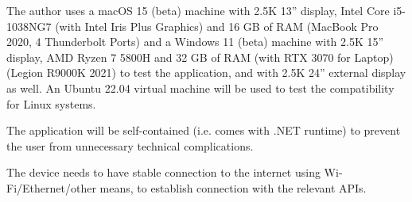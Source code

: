 The author uses a macOS 15 (beta) machine with 2.5K 13'' display, Intel Core i5-1038NG7 (with Intel Iris Plus Graphics) and 16 GB of RAM (MacBook Pro 2020, 4 Thunderbolt Ports) and a Windows 11 (beta) machine with 2.5K 15'' display, AMD Ryzen 7 5800H and 32 GB of RAM (with RTX 3070 for Laptop) (Legion R9000K 2021) to test the application, and with 2.5K 24'' external display as well. An Ubuntu 22.04 virtual machine will be used to test the compatibility for Linux systems.

The application will be self-contained (i.e. comes with .NET runtime) to prevent the user from unnecessary technical complications.

The device needs to have stable connection to the internet using Wi-Fi/Ethernet/other means, to establish connection with the relevant APIs.